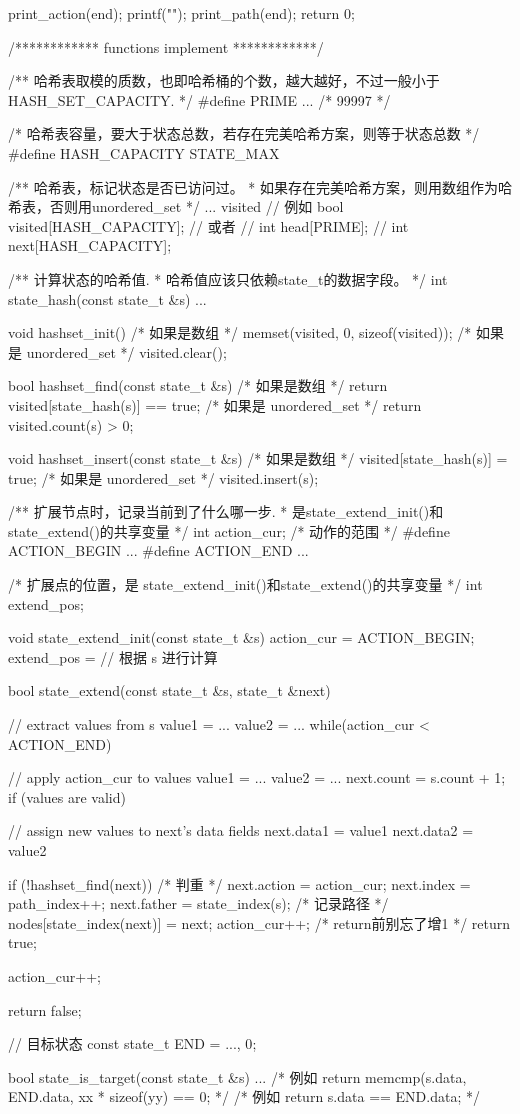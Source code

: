 \begin{Codex}[label=bfs_template2.cpp]
{    print_action(end);
    printf("\n");
    print_path(end);
    return 0;
}

/************ functions implement ************/

/** 哈希表取模的质数，也即哈希桶的个数，越大越好，不过一般小于 HASH_SET_CAPACITY. */
#define PRIME ...  /* 99997 */

/* 哈希表容量，要大于状态总数，若存在完美哈希方案，则等于状态总数 */
#define HASH_CAPACITY STATE_MAX

/** 哈希表，标记状态是否已访问过。
 * 如果存在完美哈希方案，则用数组作为哈希表，否则用unordered_set
 */
... visited
// 例如 bool visited[HASH_CAPACITY];
// 或者
// int head[PRIME];
// int next[HASH_CAPACITY];

/** 计算状态的哈希值.
 * 哈希值应该只依赖state_t的数据字段。
 */
int state_hash(const state_t &s) {
    ...
}

void hashset_init() {
    /* 如果是数组 */
    memset(visited, 0, sizeof(visited));
    /* 如果是 unordered_set */
    visited.clear();
}

bool hashset_find(const state_t &s) {
    /* 如果是数组 */
    return visited[state_hash(s)] == true;
    /* 如果是 unordered_set */
    return visited.count(s) > 0;
}

void hashset_insert(const state_t &s) {
    /* 如果是数组 */
    visited[state_hash(s)] = true;
    /* 如果是 unordered_set */
    visited.insert(s);
}

/** 扩展节点时，记录当前到了什么哪一步.
 * 是state_extend_init()和state_extend()的共享变量
 */
int action_cur;
/* 动作的范围 */
#define ACTION_BEGIN ...
#define ACTION_END ...

/* 扩展点的位置，是 state_extend_init()和state_extend()的共享变量 */
int extend_pos;

void state_extend_init(const state_t &s) {
    action_cur = ACTION_BEGIN;
    extend_pos = // 根据 s 进行计算
}

bool state_extend(const state_t &s, state_t &next) {
    // extract values from s
    value1 = ...
    value2 = ...
    while(action_cur < ACTION_END) {
        // apply action_cur to values
        value1 = ...
        value2 = ...
        next.count = s.count + 1;
        if (values are valid) {
            // assign new values to next's data fields
            next.data1 = value1
            next.data2 = value2

            if (!hashset_find(next)) { /* 判重 */
                next.action = action_cur;
                next.index = path_index++;
                next.father = state_index(s);
                /* 记录路径 */
                nodes[state_index(next)] = next;
                action_cur++;  /* return前别忘了增1 */
                return true;
            }
        }
        action_cur++;
    }
    return false;
}

// 目标状态
const state_t END = {..., 0};

bool state_is_target(const state_t &s) {
    ...
    /* 例如 return memcmp(s.data, END.data, xx * sizeof(yy) == 0; */
    /* 例如 return s.data == END.data; */
}
\end{Codex}
